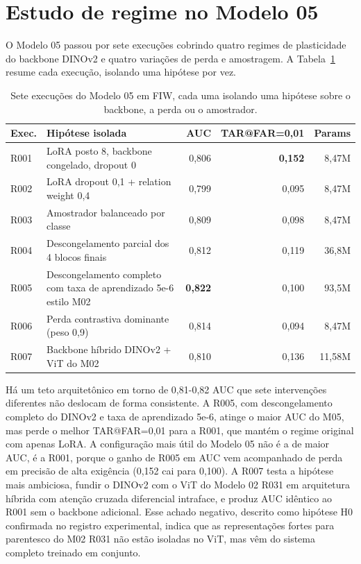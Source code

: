\section{Estudo de regime no Modelo 05}

O Modelo 05 passou por sete execuções cobrindo quatro regimes de plasticidade do backbone DINOv2 e quatro variações de perda e amostragem. A Tabela~\ref{tab:m05_runs} resume cada execução, isolando uma hipótese por vez.

\begin{table}[h]
\centering
\caption{Sete execuções do Modelo 05 em FIW, cada uma isolando uma hipótese sobre o backbone, a perda ou o amostrador.}
\label{tab:m05_runs}
\begin{tabular}{lp{6.0cm}rrr}
\hline
\textbf{Exec.} & \textbf{Hipótese isolada} & \textbf{AUC} & \textbf{TAR@FAR=0,01} & \textbf{Params} \\
\hline
R001 & LoRA posto 8, backbone congelado, dropout 0     & 0{,}806 & \textbf{0{,}152} & 8{,}47M \\
R002 & LoRA dropout 0,1 + relation weight 0,4         & 0{,}799 & 0{,}095 & 8{,}47M \\
R003 & Amostrador balanceado por classe                & 0{,}809 & 0{,}098 & 8{,}47M \\
R004 & Descongelamento parcial dos 4 blocos finais    & 0{,}812 & 0{,}119 & 36{,}8M \\
R005 & Descongelamento completo com taxa de aprendizado 5e-6 estilo M02 & \textbf{0{,}822} & 0{,}100 & 93{,}5M \\
R006 & Perda contrastiva dominante (peso 0,9)          & 0{,}814 & 0{,}094 & 8{,}47M \\
R007 & Backbone híbrido DINOv2 + ViT do M02           & 0{,}810 & 0{,}136 & 11{,}58M \\
\hline
\end{tabular}
\end{table}

Há um teto arquitetônico em torno de 0,81-0,82 AUC que sete intervenções diferentes não deslocam de forma consistente. A R005, com descongelamento completo do DINOv2 e taxa de aprendizado 5e-6, atinge o maior AUC do M05, mas perde o melhor TAR@FAR=0,01 para a R001, que mantém o regime original com apenas LoRA. A configuração mais útil do Modelo 05 não é a de maior AUC, é a R001, porque o ganho de R005 em AUC vem acompanhado de perda em precisão de alta exigência (0,152 cai para 0,100). A R007 testa a hipótese mais ambiciosa, fundir o DINOv2 com o ViT do Modelo 02 R031 em arquitetura híbrida com atenção cruzada diferencial intraface, e produz AUC idêntico ao R001 sem o backbone adicional. Esse achado negativo, descrito como hipótese H0 confirmada no registro experimental, indica que as representações fortes para parentesco do M02 R031 não estão isoladas no ViT, mas vêm do sistema completo treinado em conjunto.

